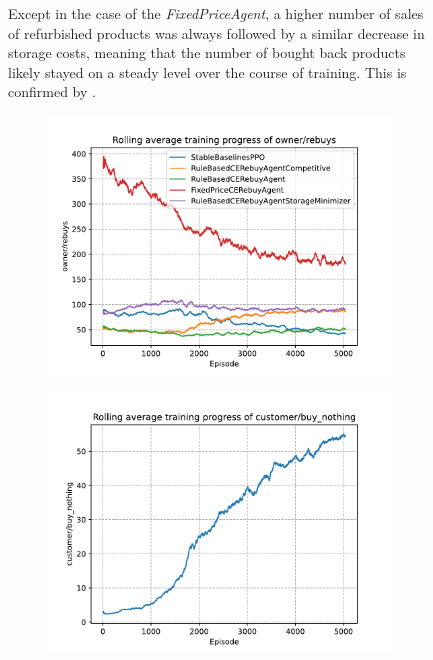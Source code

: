 \begin{figure}[ht]
\begin{subfigure}[t]{0.49\textwidth}
		\label{fig:PPOOligopolyLineStorageCosts}
	\end{subfigure}
	\caption{Except in the case of the \emph{FixedPriceAgent}, a higher number of sales of refurbished products was always followed by a similar decrease in storage costs, meaning that the number of bought back products likely stayed on a steady level over the course of training. This is confirmed by .}\label{fig:PPOOligopolyDiagramsPurchases}
\end{figure}

\begin{figure}[ht]
	\centering
	\begin{subfigure}[t]{0.49\textwidth}
		\centering
		\includegraphics[width = \textwidth]{images/experiments/PPOOligopoly/PPOOligopolyLineOwnerRebuys.pdf}\\
		\label{fig:PPOOligopolyLineOwnerRebuys}
	\end{subfigure}
	\begin{subfigure}[t]{0.49\textwidth}
		\centering
		\includegraphics[width = \textwidth]{images/experiments/PPOOligopoly/PPOOligopolyLineBuyNothing.pdf}\\

\end{subfigure}
\end{figure}
